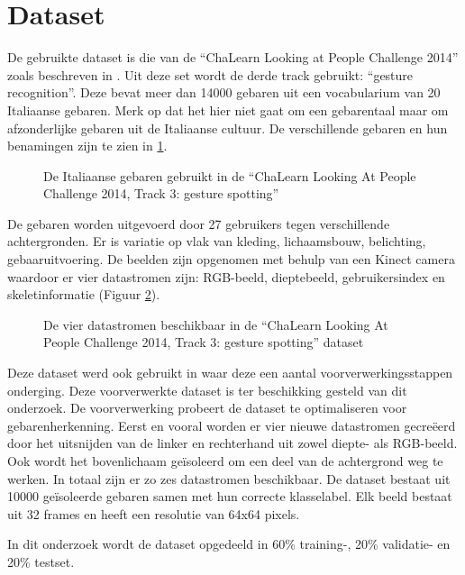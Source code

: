 \section{Dataset}
De gebruikte dataset is die van de ``ChaLearn Looking at People Challenge 2014'' zoals beschreven in \cite{escalera_chalearn_2014}. Uit deze set wordt de derde track gebruikt: ``gesture recognition''. Deze bevat meer dan 14000 gebaren uit een vocabularium van 20 Italiaanse gebaren. Merk op dat het hier niet gaat om een gebarentaal maar om afzonderlijke gebaren uit de Italiaanse cultuur. De verschillende gebaren en hun benamingen zijn te zien in \ref{fig:gebaren}.
\begin{figure}
	\centering
	\def\svgwidth{\columnwidth}
	
	\caption{De Italiaanse gebaren gebruikt in de ``ChaLearn Looking At People Challenge 2014, Track 3: gesture spotting''}
	\label{fig:gebaren}
\end{figure}
\npar De gebaren worden uitgevoerd door 27 gebruikers tegen verschillende achtergronden. Er is variatie op vlak van kleding, lichaamsbouw, belichting, gebaaruitvoering. De beelden zijn opgenomen met behulp van een Kinect camera waardoor er vier datastromen zijn: RGB-beeld, dieptebeeld, gebruikersindex en skeletinformatie (Figuur \ref{fig:chalearn-data}).
\begin{figure}
	\centering
	\def\svgwidth{\columnwidth}
	
	\caption{De vier datastromen beschikbaar in de ``ChaLearn Looking At People Challenge 2014, Track 3: gesture spotting'' dataset}
	\label{fig:chalearn-data}
\end{figure}
\npar Deze dataset werd ook gebruikt in \cite{lionel} waar deze een aantal voorverwerkingsstappen onderging. Deze voorverwerkte dataset is ter beschikking gesteld van dit onderzoek. De voorverwerking probeert de dataset te optimaliseren voor gebarenherkenning. Eerst en vooral worden er vier nieuwe datastromen gecre\"eerd door het uitsnijden van de linker en rechterhand uit zowel diepte- als RGB-beeld. Ook wordt het bovenlichaam ge\"isoleerd om een deel van de achtergrond weg te werken. In totaal zijn er zo zes datastromen beschikbaar. De dataset bestaat uit 10000 ge\"isoleerde gebaren samen met hun correcte klasselabel. Elk beeld bestaat uit 32 frames en heeft een resolutie van 64x64 pixels.

\npar In dit onderzoek wordt de dataset opgedeeld in 60\% training-, 20\% validatie- en 20\% testset.


